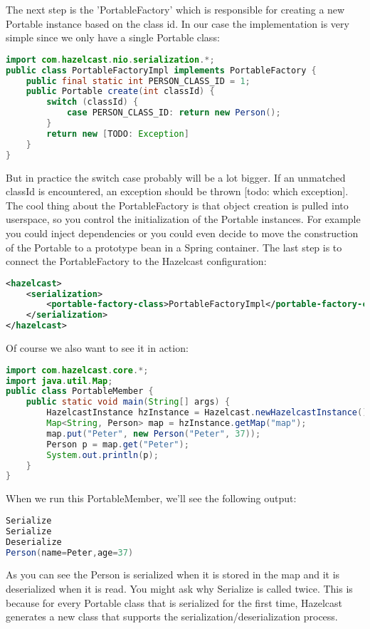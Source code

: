 The next step is the 'PortableFactory' which is responsible for creating a new Portable instance based on the class id. In our case the implementation is very simple since we only have a single Portable class:
\begin{lstlisting}[language=java]
import com.hazelcast.nio.serialization.*;
public class PortableFactoryImpl implements PortableFactory {
    public final static int PERSON_CLASS_ID = 1;
    public Portable create(int classId) {
        switch (classId) {
            case PERSON_CLASS_ID: return new Person();
        }
        return new [TODO: Exception]
    }
}
\end{lstlisting}
But in practice the switch case probably will be a lot bigger. If an unmatched classId is encountered, an exception should be thrown [todo: which exception]. The cool thing about the PortableFactory is that object creation is pulled into userspace, so you control the initialization of the Portable instances. For example you could inject dependencies or you could even decide to move the construction of the Portable to a prototype bean in a Spring container. The last step is to connect the PortableFactory to the Hazelcast configuration:
\begin{lstlisting}[language=xml]
<hazelcast>
    <serialization>
        <portable-factory-class>PortableFactoryImpl</portable-factory-class>
    </serialization>
</hazelcast>
\end{lstlisting}
Of course we also want to see it in action:
\begin{lstlisting}[language=java]
import com.hazelcast.core.*;
import java.util.Map;
public class PortableMember {
    public static void main(String[] args) {
        HazelcastInstance hzInstance = Hazelcast.newHazelcastInstance();
        Map<String, Person> map = hzInstance.getMap("map");
        map.put("Peter", new Person("Peter", 37));
        Person p = map.get("Peter");
        System.out.println(p);
    }
}
\end{lstlisting}
When we run this PortableMember, we'll see the following output:
\begin{lstlisting}[language=java]
Serialize
Serialize
Deserialize
Person(name=Peter,age=37)
\end{lstlisting}
As you can see the Person is serialized when it is stored in the map and it is deserialized when it is read. You might ask why Serialize is called twice. This is because for every Portable class that is serialized for the first time, Hazelcast generates a new class that supports the serialization/deserialization process. 

